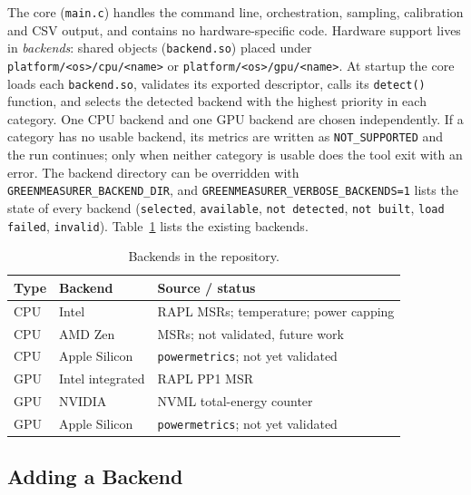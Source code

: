 The core (\texttt{main.c}) handles the command line, orchestration, sampling, calibration and CSV output, and contains no hardware-specific code. Hardware support lives in \emph{backends}: shared objects (\texttt{backend.so}) placed under \texttt{platform/<os>/cpu/<name>} or \texttt{platform/<os>/gpu/<name>}. At startup the core loads each \texttt{backend.so}, validates its exported descriptor, calls its \texttt{detect()} function, and selects the detected backend with the highest priority in each category. One CPU backend and one GPU backend are chosen independently. If a category has no usable backend, its metrics are written as \texttt{NOT\_SUPPORTED} and the run continues; only when neither category is usable does the tool exit with an error. The backend directory can be overridden with \texttt{GREENMEASURER\_BACKEND\_DIR}, and \texttt{GREENMEASURER\_VERBOSE\_BACKENDS=1} lists the state of every backend (\texttt{selected}, \texttt{available}, \texttt{not detected}, \texttt{not built}, \texttt{load failed}, \texttt{invalid}). Table~\ref{table:backends} lists the existing backends.

\begin{table}[t]
    \centering
    \caption{Backends in the repository.}
    \label{table:backends}
    \small
    \begin{tabularx}{\columnwidth}{@{}l l X@{}}
        \toprule
        \textbf{Type} & \textbf{Backend} & \textbf{Source / status} \\
        \midrule
        CPU & Intel & RAPL MSRs; temperature; power capping \\
        CPU & AMD Zen & MSRs; not validated, future work \\
        CPU & Apple Silicon & \texttt{powermetrics}; not yet validated \\
        GPU & Intel integrated & RAPL PP1 MSR \\
        GPU & NVIDIA & NVML total-energy counter \\
        GPU & Apple Silicon & \texttt{powermetrics}; not yet validated \\
        \bottomrule
    \end{tabularx}
\end{table}

\subsection{Adding a Backend}
\label{sec:adding_backend}

